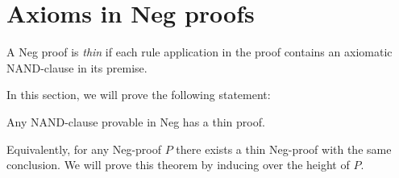 \section{Axioms in Neg proofs}
\label{sec:Axioms in Neg proofs}
\begin{definition}
  A Neg proof is \textit{thin} if each rule application in the proof contains an axiomatic NAND-clause in its premise.
\end{definition}
In this section, we will prove the following statement:
\begin{theorem}
  Any NAND-clause provable in Neg has a thin proof.
\end{theorem}
Equivalently, for any Neg-proof $P$ there exists a thin Neg-proof with the same conclusion.
We will prove this theorem by inducing over the height of $P$.
